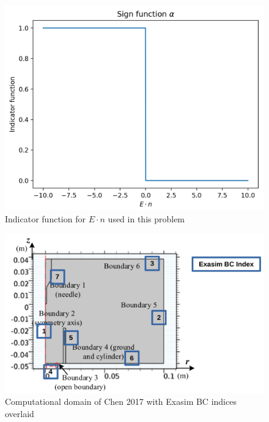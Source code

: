 \documentclass[12pt, a4paper]{report}
\begin{document}
\begin{figure}[!h]
    \centering
    \includegraphics*[width=.8\linewidth]{indicator_fcn.png}
    \caption{Indicator function for $E \cdot n$ used in this problem}
\end{figure}

\begin{figure}[!h]
    \centering
    \includegraphics*[width=.99\linewidth]{exasim_bc_index.png}
    \caption{Computational domain of Chen 2017 with Exasim BC indices overlaid}
    \label{<label>}
\end{figure}
\end{document}
